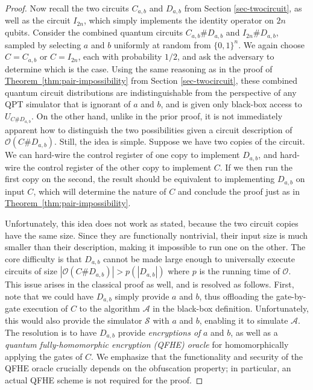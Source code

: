 \documentclass[11pt]{article}
\numberwithin{equation}{section}
\newcommand{\expref}[2]{\texorpdfstring{\hyperref[#2]{#1~\ref{#2}}}{#1~\ref{#2}}}
\newcommand{\algo}{\mathcal}
\begin{document}
{\begin{proof}
Now recall the two circuits  $C_{a,b}$ and $D_{a,b}$ from Section \ref{sec-twocircuit}, as well as the circuit $I_{2n}$, which simply implements the identity operator on $2n$ qubits. Consider the combined quantum circuits $C_{a,b}\#D_{a,b}$ and $I_{2n}\#D_{a,b}$, sampled by selecting $a$ and $b$ uniformly at random from $\{0, 1\}^n$. We again choose $C = C_{a, b}$ or $C = I_{2n}$, each with probability $1/2$, and ask the adversary to determine which is the case. Using the same reasoning as in the proof of \expref{Theorem}{thm:pair-impossibility} from Section \ref{sec-twocircuit}, these combined quantum circuit distributions are indistinguishable from the perspective of any QPT simulator that is ignorant of $a$ and $b$, and is given only black-box access to $U_{C \# D_{a, b}}$.  On the other hand, unlike in the prior proof, it is not immediately apparent how to distinguish the two possibilities given a circuit description of $\algo{O}(C \#D_{a,b})$. Still, the idea is simple. Suppose we have two copies of the circuit. We can hard-wire the control register of one copy to implement $D_{a, b}$, and hard-wire the control register of the other copy to implement $C$. If we then run the first copy on the second, the result should be equivalent to implementing $D_{a, b}$ on input $C$, which will determine the nature of $C$ and conclude the proof just as in \expref{Theorem}{thm:pair-impossibility}.

Unfortunately, this idea does not work as stated, because the two circuit copies have the same size. Since they are functionally nontrivial, their input size is much smaller than their description, making it impossible to run one on the other. The core difficulty is that $D_{a,b}$ cannot be made large enough to universally execute circuits of size $|\algo O(C \# D_{a, b})| > p(|D_{a, b}|)$ where $p$ is the running time of $\algo O$. This issue arises in the classical proof as well, and is resolved as follows. First, note that we could have $D_{a, b}$ simply provide $a$ and $b$, thus offloading the gate-by-gate execution of $C$ to the algorithm $\algo A$ in the black-box definition. Unfortunately, this would also provide the simulator $\algo S$ with $a$ and $b$, enabling it to simulate $\algo A$. The resolution is to have $D_{a, b}$ provide \emph{encryptions of} $a$ and $b$, as well as a \emph{quantum fully-homomorphic encryption (QFHE) oracle} for homomorphically applying the gates of $C$. We emphasize that the functionality and security of the QFHE oracle crucially depends on the obfuscation property; in particular, an actual QFHE scheme is not required for the proof.


\end{proof}}
\end{document}
